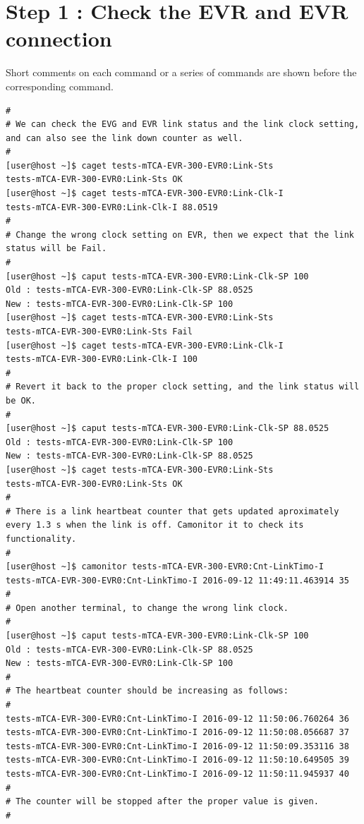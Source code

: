\documentclass[11pt
  , a4paper
  , article
  , oneside
  , showtrims
]{memoir}
\begin{document}
\section{Step 1 : Check the EVR and EVR connection}
Short comments on each command or a series of commands are shown before the corresponding command.
\begin{lstlisting}[style=termstyle]
#
# We can check the EVG and EVR link status and the link clock setting, and can also see the link down counter as well.
#
[user@host ~]$ caget tests-mTCA-EVR-300-EVR0:Link-Sts
tests-mTCA-EVR-300-EVR0:Link-Sts OK
[user@host ~]$ caget tests-mTCA-EVR-300-EVR0:Link-Clk-I
tests-mTCA-EVR-300-EVR0:Link-Clk-I 88.0519
#
# Change the wrong clock setting on EVR, then we expect that the link status will be Fail.  
#
[user@host ~]$ caput tests-mTCA-EVR-300-EVR0:Link-Clk-SP 100
Old : tests-mTCA-EVR-300-EVR0:Link-Clk-SP 88.0525
New : tests-mTCA-EVR-300-EVR0:Link-Clk-SP 100
[user@host ~]$ caget tests-mTCA-EVR-300-EVR0:Link-Sts
tests-mTCA-EVR-300-EVR0:Link-Sts Fail
[user@host ~]$ caget tests-mTCA-EVR-300-EVR0:Link-Clk-I
tests-mTCA-EVR-300-EVR0:Link-Clk-I 100
#
# Revert it back to the proper clock setting, and the link status will be OK.
#
[user@host ~]$ caput tests-mTCA-EVR-300-EVR0:Link-Clk-SP 88.0525
Old : tests-mTCA-EVR-300-EVR0:Link-Clk-SP 100
New : tests-mTCA-EVR-300-EVR0:Link-Clk-SP 88.0525
[user@host ~]$ caget tests-mTCA-EVR-300-EVR0:Link-Sts
tests-mTCA-EVR-300-EVR0:Link-Sts OK
#
# There is a link heartbeat counter that gets updated aproximately every 1.3 s when the link is off. Camonitor it to check its functionality.
#
[user@host ~]$ camonitor tests-mTCA-EVR-300-EVR0:Cnt-LinkTimo-I
tests-mTCA-EVR-300-EVR0:Cnt-LinkTimo-I 2016-09-12 11:49:11.463914 35
#
# Open another terminal, to change the wrong link clock. 
#
[user@host ~]$ caput tests-mTCA-EVR-300-EVR0:Link-Clk-SP 100
Old : tests-mTCA-EVR-300-EVR0:Link-Clk-SP 88.0525
New : tests-mTCA-EVR-300-EVR0:Link-Clk-SP 100
#
# The heartbeat counter should be increasing as follows: 
#
tests-mTCA-EVR-300-EVR0:Cnt-LinkTimo-I 2016-09-12 11:50:06.760264 36  
tests-mTCA-EVR-300-EVR0:Cnt-LinkTimo-I 2016-09-12 11:50:08.056687 37  
tests-mTCA-EVR-300-EVR0:Cnt-LinkTimo-I 2016-09-12 11:50:09.353116 38  
tests-mTCA-EVR-300-EVR0:Cnt-LinkTimo-I 2016-09-12 11:50:10.649505 39  
tests-mTCA-EVR-300-EVR0:Cnt-LinkTimo-I 2016-09-12 11:50:11.945937 40 
#
# The counter will be stopped after the proper value is given.
# 
\end{lstlisting}
\end{document}
